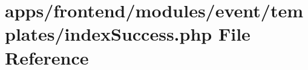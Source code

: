 \hypertarget{frontend_2modules_2event_2templates_2index_success_8php}{\section{apps/frontend/modules/event/templates/index\-Success.php File Reference}
\label{frontend_2modules_2event_2templates_2index_success_8php}
}
